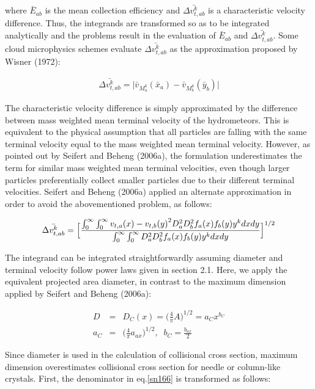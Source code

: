 where $\bar{E}_{ab}$ is the mean collection efficiency and $\bar{\Delta v_{t,ab}^{k}}$ is a characteristic velocity difference. Thus, the integrands are transformed so as to be integrated analytically and the problems result in the evaluation of $\bar{E}_{ab}$ and $\bar{\Delta v_{t,ab}^{k}}$. Some cloud microphysics schemes evaluate $\bar{\Delta v_{t,ab}^{k}}$ as the approximation proposed by Wisner (1972):

\begin{eqnarray}
\bar{\Delta v_{t,ab}^{k}}=\bigl|\bar{v}_{M_{a}^{k}}(\bar{x}_{a})-\bar{v}_{M_{b}^{k}}(\bar{y}_{b})\bigr|\label{sn165}
\end{eqnarray}

The characteristic velocity difference is simply approximated by the difference between mass weighted mean terminal velocity of the hydrometeors. This is equivalent to the physical assumption that all particles are falling with the same terminal velocity equal to the mass weighted mean terminal velocity. However, as pointed out by Seifert and Beheng (2006a), the formulation underestimates the term for similar mass weighted mean terminal velocities, even though larger particles preferentially collect smaller particles due to their different terminal velocities. Seifert and Beheng (2006a) applied an alternate approximation in order to avoid the abovementioned problem, as follows:

\begin{eqnarray}
\bar{\Delta v_{t,ab}^{k}}=\Bigl[\frac{\int_{0}^{\infty}\int_{0}^{\infty}{v_{t,a}(x)-v_{t,b}(y)}^{2}D_{a}^{2}D_{b}^{2}f_{a}(x)f_{b}(y)y^{k}dxdy}
{\int_{0}^{\infty}\int_{0}^{\infty}D_{a}^{2}D_{b}^{2}f_{a}(x)f_{b}(y)y^{k}dxdy}\Bigr]^{1/2}\label{sn166}
\end{eqnarray}

The integrand can be integrated straightforwardly assuming diameter and terminal velocity follow power laws given in section 2.1. Here, we apply the equivalent projected area diameter, in contrast to the maximum dimension applied by Seifert and Beheng (2006a):

\begin{eqnarray}
D&=&D_{C}(x)=\bigl(\frac{4}{\pi}A\bigr)^{1/2}=a_{C}x^{b_{C}}\label{sn167}\\
a_{C}&=&\bigl(\frac{4}{\pi}a_{ax}\bigr)^{1/2},\;\;b_{C}=\frac{b_{ax}}{2}\nonumber
\end{eqnarray}

Since diameter is used in the calculation of collisional cross section, maximum dimension overestimates collisional cross section for needle or column-like crystals. First, the denominator in eq.\ref{sn166} is transformed as follows:

